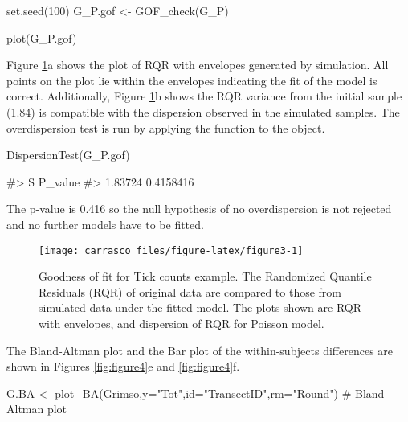 \begin{Schunk}
\begin{Sinput}
set.seed(100)
G_P.gof <- GOF_check(G_P)
\end{Sinput}
\end{Schunk}

\begin{Schunk}
\begin{Sinput}
plot(G_P.gof)
\end{Sinput}
\end{Schunk}

Figure \ref{fig:figure3}a shows the plot of RQR with envelopes generated
by simulation. All points on the plot lie within the envelopes
indicating the fit of the model is correct. Additionally, Figure
\ref{fig:figure3}b shows the RQR variance from the initial sample (1.84)
is compatible with the dispersion observed in the simulated samples. The
overdispersion test is run by applying the function 
to the  object.

\begin{Schunk}
\begin{Sinput}
DispersionTest(G_P.gof)
\end{Sinput}
\begin{Soutput}
#>        S   P_value
#>  1.83724 0.4158416
\end{Soutput}
\end{Schunk}

The p-value is 0.416 so the null hypothesis of no overdispersion is not
rejected and no further models have to be fitted.

\begin{Schunk}
\begin{figure}
\texttt{[image: carrasco\_files/figure-latex/figure3-1]} \caption[Goodness of fit for Tick counts example]{Goodness of fit for Tick counts example. The Randomized Quantile Residuals (RQR) of original data are compared to those from simulated data under the fitted model. The plots shown are RQR with envelopes, and dispersion of RQR for Poisson model.}\label{fig:figure3}
\end{figure}
\end{Schunk}

The Bland-Altman plot and the Bar plot of the within-subjects
differences are shown in Figures \ref{fig:figure4}e and
\ref{fig:figure4}f.

\begin{Schunk}
\begin{Sinput}
G.BA <- plot_BA(Grimso,y="Tot",id="TransectID",rm="Round") # Bland-Altman plot
\end{Sinput}
\end{Schunk}

